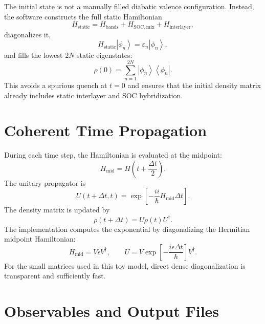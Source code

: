 \documentclass[11pt,a4paper]{article}
\newcommand{\ket}[1]{\left|#1\right\rangle}
\newcommand{\bra}[1]{\left\langle #1\right|}
\begin{document}
The initial state is not a manually filled diabatic valence configuration.  Instead, the software constructs the full static Hamiltonian
\begin{equation}
H_{\mathrm{static}}=H_{\mathrm{bands}}+H_{\mathrm{SOC,mix}}+H_{\mathrm{interlayer}},
\end{equation}
diagonalizes it,
\begin{equation}
H_{\mathrm{static}}\ket{\phi_n}=\varepsilon_n\ket{\phi_n},
\end{equation}
and fills the lowest $2N$ static eigenstates:
\begin{equation}
\rho(0)=\sum_{n=1}^{2N}\ket{\phi_n}\bra{\phi_n}.
\end{equation}
This avoids a spurious quench at $t=0$ and ensures that the initial density matrix already includes static interlayer and SOC hybridization.

\section{Coherent Time Propagation}

During each time step, the Hamiltonian is evaluated at the midpoint:
\begin{equation}
H_{\mathrm{mid}}=H\left(t+\frac{\Delta t}{2}\right).
\end{equation}
The unitary propagator is
\begin{equation}
U(t+\Delta t,t)
=
\exp\left[-\frac{ii}{\hbar}H_{\mathrm{mid}}\Delta t\right].
\end{equation}
The density matrix is updated by
\begin{equation}
\rho(t+\Delta t)=U\rho(t)U^\dagger.
\end{equation}
The implementation computes the exponential by diagonalizing the Hermitian midpoint Hamiltonian:
\begin{equation}
H_{\mathrm{mid}}=V\epsilon V^\dagger,
\qquad
U=V\exp\left[-\frac{i\epsilon\Delta t}{\hbar}\right]V^\dagger.
\end{equation}
For the small matrices used in this toy model, direct dense diagonalization is transparent and sufficiently fast.


\section{Observables and Output Files}
\end{document}
